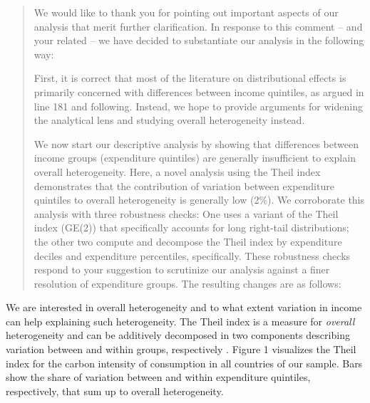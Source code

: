 \documentclass[11pt]{article}
\newenvironment{response}
{\begin{quote}\color{black}}
{\end{quote}}
\begin{document}
\begin{response}

We would like to thank you for pointing out important aspects of our analysis that merit further clarification. In response to this comment -- and your related  -- we have decided to substantiate our analysis in the following way:

First, it is correct that most of the literature on distributional effects is primarily concerned with differences between income quintiles, as argued in line 181 and following. Instead, we hope to provide arguments for widening the analytical lens and studying overall heterogeneity instead. 

We now start our descriptive analysis by showing that differences between income groups (expenditure quintiles) are generally insufficient to explain overall heterogeneity. Here, a novel analysis using the Theil index demonstrates that the contribution of variation between expenditure quintiles to overall heterogeneity is generally low (2\%). We corroborate this analysis with three robustness checks: One uses a variant of the Theil index (GE(2)) that specifically accounts for long right-tail distributions; the other two compute and decompose the Theil index by expenditure deciles and expenditure percentiles, specifically. These robustness checks respond to your suggestion to scrutinize our analysis against a finer resolution of expenditure groups. The resulting changes are as follows:

\end{response}

\begin{revisionbox}
    We are interested in overall heterogeneity and to what extent variation in income can help explaining such heterogeneity. The Theil index is a measure for \textit{overall} heterogeneity and can be additively decomposed in two components describing variation between and within groups, respectively \autocite{Shorrocks.1980,Cowell.2011a}. Figure 1 visualizes the Theil index for the carbon intensity of consumption in all countries of our sample. Bars show the share of variation between and within expenditure quintiles, respectively, that sum up to overall heterogeneity. 


\end{revisionbox}
\end{document}
